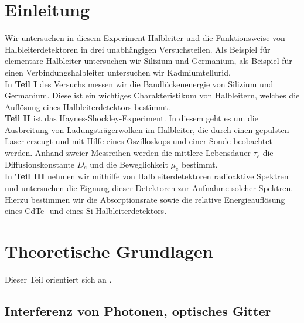 \documentclass[12pt]{article}
\title{\vspace{0cm}{\Huge Fortgeschrittenen-Praktikum I:\\ \vspace{1cm}  Halbleiter}}
\author{Saskia Bondza\\Simon Stephan}
\date{Durchgeführt am 07.09.2016}
\begin{document}
\maketitle
\newpage

\thispagestyle{empty}
\tableofcontents
\newpage

\section{Einleitung}

Wir untersuchen in diesem Experiment Halbleiter und die Funktionsweise von Halbleiterdetektoren in drei unabhängigen Versuchsteilen. Als Beispiel für elementare Halbleiter untersuchen wir Silizium und Germanium, als Beispiel für einen Verbindungshalbleiter untersuchen wir Kadmiumtellurid.
\\
In \textbf{Teil I} des Versuchs messen wir die Bandlückenenergie von Silizium und Germanium. Diese ist ein wichtiges Charakteristikum von Halbleitern, welches die Auflösung eines Halbleiterdetektors bestimmt.
\\
\textbf{Teil II} ist das Haynes-Shockley-Experiment. In diesem geht es um die Ausbreitung von Ladungsträgerwolken im Halbleiter, die durch einen gepulsten Laser erzeugt und mit Hilfe eines Oszilloskops und einer Sonde beobachtet werden. Anhand zweier Messreihen werden die mittlere Lebensdauer $\tau_e$ die Diffusionskonstante $D_e$ und die Beweglichkeit $\mu_e$ bestimmt.
\\
In \textbf{Teil III} nehmen wir mithilfe von Halbleiterdetektoren radioaktive Spektren und untersuchen die Eignung dieser Detektoren zur Aufnahme solcher Spektren. Hierzu bestimmen wir die Absorptionsrate sowie die relative Energieauflösung eines CdTe- und eines Si-Halbleiterdetektors.

\newpage
\section[Theoretische Grundlagen]{Theoretische Grundlagen}

Dieser Teil orientiert sich an \cite{staat}.



\subsection{Interferenz von Photonen, optisches Gitter}
\end{document}
